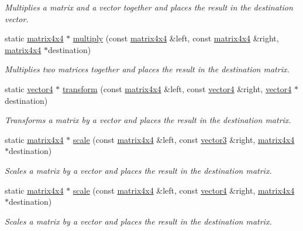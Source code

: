 \begin{DoxyCompactItemize}
\begin{DoxyCompactList}\small\item\em Multiplies a matrix and a vector together and places the result in the destination vector. \end{DoxyCompactList}\item 
static \hyperlink{classflounder_1_1matrix4x4}{matrix4x4} $\ast$ \hyperlink{classflounder_1_1matrix4x4_a25262af6f1e187bb79d702f751d23b06}{multiply} (const \hyperlink{classflounder_1_1matrix4x4}{matrix4x4} \&left, const \hyperlink{classflounder_1_1matrix4x4}{matrix4x4} \&right, \hyperlink{classflounder_1_1matrix4x4}{matrix4x4} $\ast$destination)
\begin{DoxyCompactList}\small\item\em Multiplies two matrices together and places the result in the destination matrix. \end{DoxyCompactList}\item 
static \hyperlink{classflounder_1_1vector4}{vector4} $\ast$ \hyperlink{classflounder_1_1matrix4x4_ae377db4fe0e59fd748462fdc2f6a8939}{transform} (const \hyperlink{classflounder_1_1matrix4x4}{matrix4x4} \&left, const \hyperlink{classflounder_1_1vector4}{vector4} \&right, \hyperlink{classflounder_1_1vector4}{vector4} $\ast$destination)
\begin{DoxyCompactList}\small\item\em Transforms a matrix by a vector and places the result in the destination matrix. \end{DoxyCompactList}\item 
static \hyperlink{classflounder_1_1matrix4x4}{matrix4x4} $\ast$ \hyperlink{classflounder_1_1matrix4x4_ad7f8cccba89862a3f574b601f0744174}{scale} (const \hyperlink{classflounder_1_1matrix4x4}{matrix4x4} \&left, const \hyperlink{classflounder_1_1vector3}{vector3} \&right, \hyperlink{classflounder_1_1matrix4x4}{matrix4x4} $\ast$destination)
\begin{DoxyCompactList}\small\item\em Scales a matrix by a vector and places the result in the destination matrix. \end{DoxyCompactList}\item 
static \hyperlink{classflounder_1_1matrix4x4}{matrix4x4} $\ast$ \hyperlink{classflounder_1_1matrix4x4_a5ac6ac7707c5e5c01654303b5b13c3ba}{scale} (const \hyperlink{classflounder_1_1matrix4x4}{matrix4x4} \&left, const \hyperlink{classflounder_1_1vector4}{vector4} \&right, \hyperlink{classflounder_1_1matrix4x4}{matrix4x4} $\ast$destination)
\begin{DoxyCompactList}\small\item\em Scales a matrix by a vector and places the result in the destination matrix. \end{DoxyCompactList}\item 

\end{DoxyCompactItemize}
